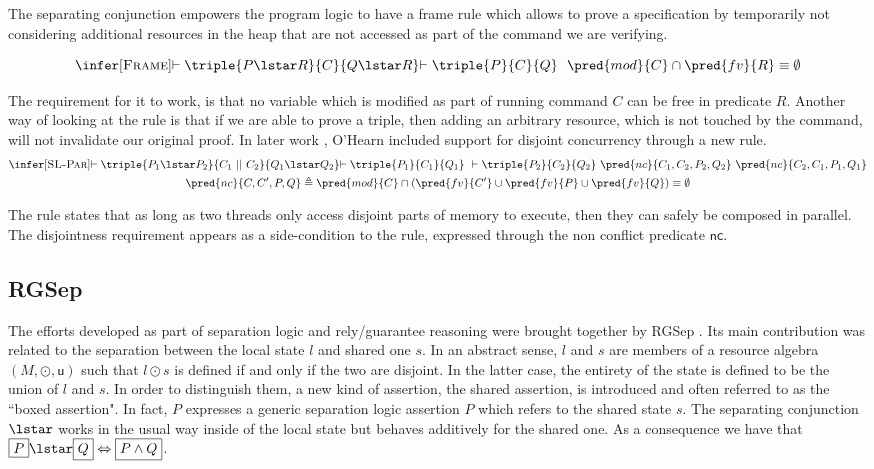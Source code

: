 The separating conjunction empowers the program logic to have a frame rule which allows to prove a specification by temporarily not considering additional resources in the heap that are not accessed as part of the command we are verifying.

\[
\infer[\textsc{Frame}]
{\vdash \triple{P \lstar R}{C}{Q \lstar R}}
{\vdash \triple{P}{C}{Q} \ \ \pred{mod}{C} \cap \pred{fv}{R} \equiv \emptyset}
\]

The requirement for it to work, is that no variable which is modified as part of running command $C$ can be free in predicate $R$. Another way of looking at the rule is that if we are able to prove a triple, then adding an arbitrary resource, which is not touched by the command, will not invalidate our original proof. In later work \cite{csl}, O'Hearn included support for disjoint concurrency through a new rule.
\begin{gather*}
\infer[\textsc{SL-Par}]
{\vdash \triple{P_1 \lstar P_2}{C_1\ ||\ C_2}{Q_1 \lstar Q_2}}
{\vdash \triple{P_1}{C_1}{Q_1} \ \vdash \triple{P_2}{C_2}{Q_2} \ \pred{nc}{C_1, C_2, P_2, Q_2} \ \pred{nc}{C_2, C_1, P_1, Q_1}}
\\
\pred{nc}{C, C', P, Q} \triangleq \pred{mod}{C} \cap (\pred{fv}{C'} \cup \pred{fv}{P} \cup \pred{fv}{Q}) \equiv \emptyset
\end{gather*}

The rule states that as long as two threads only access disjoint parts of memory to execute, then they can safely be composed in parallel. The disjointness requirement appears as a side-condition to the rule, expressed through the non conflict predicate $\mathsf{nc}$.

\subsection{RGSep} \label{rgsep}

The efforts developed as part of separation logic and rely/guarantee reasoning were brought together by RGSep \cite{viktor}. Its main contribution was related to the separation between the local state $l$ and shared one $s$. In an abstract sense, $l$ and $s$ are members of a resource algebra $(M, \odot, \mathsf{u})$ such that $l \odot s$ is defined if and only if the two are disjoint. In the latter case, the entirety of the state is defined to be the union of $l$ and $s$. In order to distinguish them, a new kind of assertion, the shared assertion, is introduced and often referred to as the ``boxed assertion". In fact, $\boxed{P}$ expresses a generic separation logic assertion $P$ which refers to the shared state $s$. The separating conjunction $\lstar$ works in the usual way inside of the local state but behaves additively for the shared one. As a consequence we have that $\boxed{P} \lstar \boxed{Q} \Leftrightarrow \boxed{P \land Q}$.

